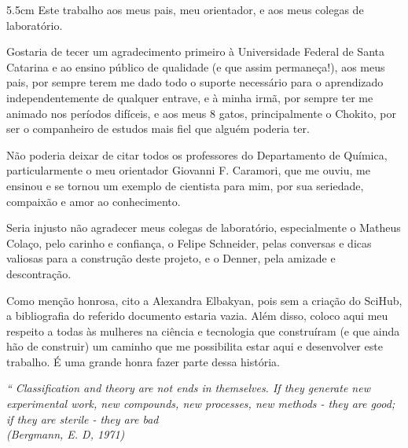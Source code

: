 \begin{dedicatoria}
	\vspace*{\fill}
	\noindent
	\begin{adjustwidth*}{}{5.5cm}     
		Este trabalho aos meus pais, meu orientador, e aos meus colegas de laboratório.
	\end{adjustwidth*}
\end{dedicatoria}

\begin{agradecimentos}
	Gostaria de tecer um agradecimento primeiro à Universidade Federal de Santa Catarina e ao ensino público de qualidade (e que assim permaneça!), aos meus pais, por sempre terem me dado todo o suporte necessário para o aprendizado independentemente de qualquer entrave, e à minha irmã, por sempre ter me animado nos períodos difíceis, e aos meus 8 gatos, principalmente o Chokito, por ser o companheiro de estudos mais fiel que alguém poderia ter.

Não poderia deixar de citar todos os professores do Departamento de Química, particularmente o meu orientador Giovanni F. Caramori, que me ouviu, me ensinou e se tornou um exemplo de cientista para mim, por sua seriedade, compaixão e amor ao conhecimento. 

Seria injusto não agradecer meus colegas de laboratório, especialmente o Matheus Colaço, pelo carinho e confiança, o Felipe Schneider, pelas conversas e dicas valiosas para a construção deste projeto, e o Denner, pela amizade e descontração.

Como menção honrosa, cito a Alexandra Elbakyan, pois sem a criação do SciHub, a bibliografia do referido documento estaria vazia. Além disso, coloco aqui meu respeito a todas às mulheres na ciência e tecnologia que construíram (e que ainda hão de construir) um caminho que me possibilita estar aqui e desenvolver este trabalho. É uma grande honra fazer parte dessa história.
\end{agradecimentos}

\begin{epigrafe}
	\vspace*{\fill}
	\begin{flushright}
		\textit{``
		Classification and theory are not ends in themselves. If they generate new experimental work, new compounds, new processes, new methods - they are good;
		if they are sterile - they are bad  \\
		(Bergmann, E. D, 1971)}
	\end{flushright}
\end{epigrafe}

